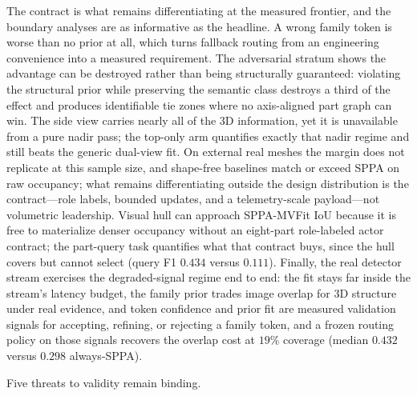 \documentclass[11pt,a4paper]{article}
\begin{document}
The contract is what remains differentiating at the measured frontier, and
the boundary analyses are as informative as the headline. A wrong family token
is worse than no prior at all, which turns fallback routing from an
engineering convenience into a measured requirement. The adversarial stratum
shows the advantage can be destroyed rather than being structurally
guaranteed: violating the
structural prior while preserving the semantic class destroys a third of the
effect and produces identifiable tie zones where no axis-aligned part graph
can win. The side view carries
nearly all of the 3D information, yet it is unavailable from a pure nadir
pass; the top-only arm quantifies exactly that nadir regime and still beats
the generic dual-view fit. On external real meshes the margin does not
replicate at this sample size, and
shape-free baselines match or exceed SPPA on raw occupancy; what remains
differentiating outside the design distribution is the contract---role labels,
bounded updates, and a telemetry-scale payload---not volumetric leadership.
Visual hull can approach SPPA-MVFit IoU because it is free to materialize
denser occupancy without an eight-part role-labeled actor contract; the
part-query task quantifies what that contract buys, since the hull covers but
cannot select (query F1 \(0.434\) versus \(0.111\)). Finally, the real
detector stream exercises the degraded-signal regime end to end: the fit
stays far inside the stream's latency budget, the family prior trades image
overlap for 3D structure under real evidence, and token confidence and prior
fit are measured validation signals for accepting, refining, or rejecting a
family token, and a frozen routing policy on those signals recovers the
overlap cost at \(19\%\) coverage (median \(0.432\) versus \(0.298\)
always-SPPA).

\label{sec:threats}Five threats to validity remain binding.
\end{document}
